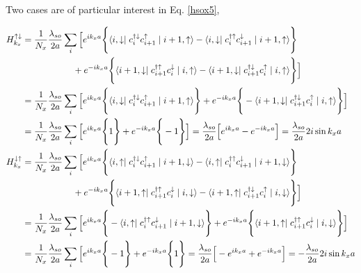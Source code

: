 \documentclass[10pt,prb,showpacs,amssymb,floatfix]{revtex4-1}
\newcommand{\nn}{\nonumber}
\begin{document}
Two cases are of particular interest in Eq. \eqref{hsox5}, 

\begin{align}
H_{k_x}^{\uparrow \downarrow} &= \frac{1}{N_x} \frac{\lambda_{so}}{2a}\sum_{i} \Big{[} e^{i k_x a} \Bigg{\{}   \langle i,\downarrow \mid c_{i}^{\dagger \downarrow} c_{i+1}^\uparrow \mid i+1,\uparrow \rangle - \langle i,\downarrow \mid c_{i}^{\dagger \uparrow} c_{i+1}^\downarrow \mid i+1,\uparrow \rangle \Bigg{\}}   \nn\\& ~~~~~~~~~~~~~~~~~ + e^{-i k_x a}  \Bigg{\{}  \langle i+1,\downarrow \mid    c_{i+1}^{\dagger \uparrow} c_{i}^\downarrow \mid i,\uparrow \rangle - \langle i+1,\downarrow \mid    c_{i+1}^{\dagger \downarrow} c_{i}^\uparrow \mid i,\uparrow \rangle \Bigg{\}}  \Big{]} \\
&= \frac{1}{N_x} \frac{\lambda_{so}}{2a}\sum_{i} \Big{[} e^{i k_x a} \Bigg{\{}   \langle i,\downarrow \mid c_{i}^{\dagger \downarrow} c_{i+1}^\uparrow \mid i+1,\uparrow \rangle \Bigg{\}}  + e^{-i k_x a}  \Bigg{\{}  - \langle i+1,\downarrow \mid    c_{i+1}^{\dagger \downarrow} c_{i}^\uparrow \mid i,\uparrow \rangle \Bigg{\}}  \Big{]} \\
&= \frac{1}{N_x} \frac{\lambda_{so}}{2a}\sum_{i} \Big{[} e^{i k_x a} \Bigg{\{} 1 \Bigg{\}}  + e^{-i k_x a}  \Bigg{\{}  -1 \Bigg{\}}  \Big{]} =  \frac{\lambda_{so}}{2a} \Big{[} e^{i k_x a}   - e^{-i k_x a}    \Big{]} = \frac{\lambda_{so}}{2a} 2i\sin k_xa \\
H_{k_x}^{\downarrow \uparrow} &=   \frac{1}{N_x} \frac{\lambda_{so}}{2a}\sum_{i} \Big{[} e^{i k_x a} \Bigg{\{}   \langle i,\uparrow \mid c_{i}^{\dagger \downarrow} c_{i+1}^\uparrow \mid i+1,\downarrow\rangle - \langle i,\uparrow \mid c_{i}^{\dagger \uparrow} c_{i+1}^\downarrow \mid i+1,\downarrow\rangle \Bigg{\}}   \nn\\& ~~~~~~~~~~~~~~~~~ + e^{-i k_x a}  \Bigg{\{}  \langle i+1,\uparrow \mid    c_{i+1}^{\dagger \uparrow} c_{i}^\downarrow \mid i,\downarrow\rangle - \langle i+1,\uparrow \mid    c_{i+1}^{\dagger \downarrow} c_{i}^\uparrow \mid i,\downarrow\rangle \Bigg{\}}  \Big{]}  \\
&=   \frac{1}{N_x} \frac{\lambda_{so}}{2a}\sum_{i} \Big{[} e^{i k_x a} \Bigg{\{}  - \langle i,\uparrow \mid c_{i}^{\dagger \uparrow} c_{i+1}^\downarrow \mid i+1,\downarrow\rangle \Bigg{\}}  + e^{-i k_x a}  \Bigg{\{}  \langle i+1,\uparrow \mid    c_{i+1}^{\dagger \uparrow} c_{i}^\downarrow \mid i,\downarrow\rangle \Bigg{\}}  \Big{]} \\
&=   \frac{1}{N_x} \frac{\lambda_{so}}{2a}\sum_{i} \Big{[} e^{i k_x a} \Bigg{\{}  -1 \Bigg{\}}  + e^{-i k_x a}  \Bigg{\{}  1 \Bigg{\}} = \frac{\lambda_{so}}{2a} \Big{[} -e^{i k_x a}  + e^{-i k_x a}  \Big{]} = -\frac{\lambda_{so}}{2a} 2i \sin k_xa
\end{align}
\end{document}
